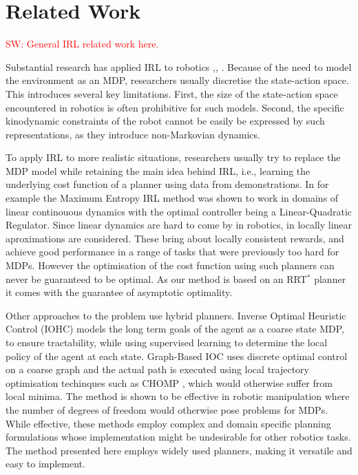 \documentclass{article}  %
\newcommand{\sw}[1]{\textcolor{red}{SW: #1}}
\newcommand{\ks}[1]{\textcolor{green}{SW: #1}}
\begin{document}
\section{Related Work}

\sw{General IRL related work here.}

Substantial research has applied IRL to robotics \cite{henry2010learning},\cite{abbeel2008apprenticeship}, \cite{vasquez2014inverse}. Because of the need to model the environment as an MDP, researchers usually discretise the state-action space. This introduces several key limitations. First, the size of the state-action space encountered in robotics is often prohibitive for such models. Second, the specific kinodynamic constraints of the robot cannot be easily be expressed by such representations, as they introduce non-Markovian dynamics. 


To apply IRL to more realistic situations, researchers usually try to replace the MDP model while retaining the main idea behind IRL, i.e., learning the underlying cost function of a planner using data from demonstrations. 
 In \cite{ziebart2010modelingthesis} for example the Maximum Entropy IRL method was shown to work in domains of linear continouous dynamics with the optimal controller being a Linear-Quadratic Regulator. Since linear dynamics are hard to come by in robotics, in \cite{2012-cioc} locally linear aproximations are considered. These bring about locally consistent rewards, and achieve good performance in a range of tasks that were previously too hard for MDPs. However the optimisation of the cost function using such planners can never be guaranteed to be optimal. As our method is based on an RRT$^*$ planner it comes with the guarantee of asymptotic optimality.

Other approaches to the problem use hybrid planners. Inverse Optimal Heuristic Control (IOHC) \cite{ratliff2009inverse} models the long term goals of the agent as a coarse state MDP, to ensure tractability, while using supervised learning to determine the local policy of the agent at each state. Graph-Based IOC \cite{byravan2015graph} uses discrete optimal control on a coarse graph and the actual path is executed using local trajectory optimisation techinques such as CHOMP \cite{ratliff2009chomp}, which would otherwise suffer from local minima. The method is shown to be effective in robotic manipulation where the number of degrees of freedom would otherwise pose problems for MDPs. While effective, these methods employ complex and domain specific planning formulations whose implementation might be undesirable for other robotics tasks. The method presented here employs widely used planners, making it versatile and easy to implement. 
\end{document}
